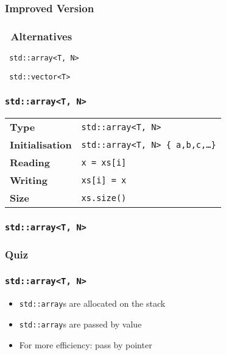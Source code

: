 \documentclass{../ucll-slides}
\begin{document}
\begin{frame}
  \frametitle{Improved Version}
\end{frame}

\begin{frame}
  \frametitle{\cpp\ Alternatives}
  \begin{center} \tt
    std::array<T, N>
  \end{center}
  \vskip5mm
  \begin{center} \tt
    std::vector<T>
  \end{center}
\end{frame}

\begin{frame}
  \frametitle{\tt std::array<T, N>}
  \begin{center}
    \begin{tabular}{ll}
      \bf Type & {\tt std::array<T, N>} \\[2mm]
      \bf Initialisation & {\tt std::array<T, N> \{ a,b,c,\dots \}} \\[2mm]
      \bf Reading & {\tt x = xs[i]} \\[2mm]
      \bf Writing & {\tt xs[i] = x} \\[2mm]
      \bf Size & {\tt xs.size()} \\
    \end{tabular}
  \end{center}
\end{frame}

\begin{frame}
  \frametitle{\tt std::array<T, N>}
\end{frame}

\begin{frame}
  \frametitle{Quiz}
\end{frame}

\begin{frame}
  \frametitle{\tt std::array<T, N>}
  \begin{itemize}
    \item {\tt std::array}s are allocated on the stack
    \item {\tt std::array}s are passed by value
    \item For more efficiency: pass by pointer
  \end{itemize}
\end{frame}
\end{document}
